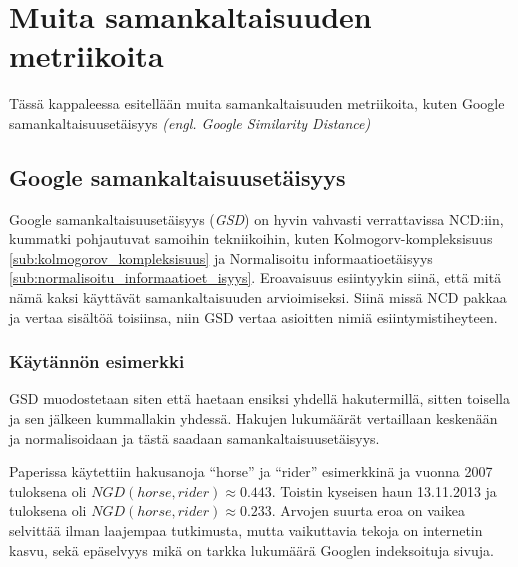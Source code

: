 \documentclass[12pt,finnish,draft,twoside]{tktltiki2}
\theoremstyle{definition}
\theoremstyle{remark}
\newcommand{\engl}[1]{\emph{(engl. #1)}}
\begin{document}
\section{Muita samankaltaisuuden metriikoita} %
\label{sec:muita_samankaltaisuuden_metriikoita}
  Tässä kappaleessa esitellään muita samankaltaisuuden metriikoita, kuten Google samankaltaisuusetäisyys \engl{Google Similarity Distance}
  \subsection{Google samankaltaisuusetäisyys} %
  \label{sub:google_similarity_distance}
    Google samankaltaisuusetäisyys (\emph{GSD}) on hyvin vahvasti verrattavissa NCD:iin, kummatki pohjautuvat samoihin tekniikoihin, kuten Kolmogorv-kompleksisuus \ref{sub:kolmogorov_kompleksisuus} ja Normalisoitu informaatioetäisyys \ref{sub:normalisoitu_informaatioet_isyys}. Eroavaisuus esiintyykin siinä, että mitä nämä kaksi käyttävät samankaltaisuuden arvioimiseksi. Siinä missä NCD pakkaa ja vertaa sisältöä toisiinsa, niin GSD vertaa asioitten nimiä esiintymistiheyteen.

    \subsubsection{Käytännön esimerkki} %
    \label{ssub:k_yt_nn_n_esimerkki}
      GSD muodostetaan siten että haetaan ensiksi yhdellä hakutermillä, sitten toisella ja sen jälkeen kummallakin yhdessä. Hakujen lukumäärät vertaillaan keskenään ja normalisoidaan ja tästä saadaan samankaltaisuusetäisyys.

      Paperissa \cite{cilibrasi2007google} käytettiin hakusanoja ``horse'' ja ``rider'' esimerkkinä ja vuonna 2007 tuloksena oli $NGD(horse, rider) \approx 0.443$. Toistin kyseisen haun 13.11.2013 ja tuloksena oli $NGD(horse, rider) \approx 0.233$. Arvojen suurta eroa on vaikea selvittää ilman laajempaa tutkimusta, mutta vaikuttavia tekoja on internetin kasvu, sekä epäselvyys mikä on tarkka lukumäärä Googlen indeksoituja sivuja.


\pagebreak
%
%

%

% 





%
\end{document}
